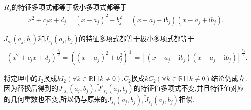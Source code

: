 \documentclass[../../main.tex]{subfiles}
\begin{document}
\begin{theorem}[实数域上的广义Jordan标准型]
$R_j$的特征多项式都等于极小多项式都等于
\begin{align*}
x^2+c_jx+d_j=(x-a_j)^2+b_j^2=\left( x-a_j-\mathrm{i}b_j \right) \left( x-a_j+\mathrm{i}b_j \right).
\end{align*}

$J_{s_j}(a_j,b_j)$和$\widetilde{J}_{s_j}(a_j,b_j)$的特征多项式都等于极小多项式都等于
\begin{align*}
(x^2+c_jx+d_j)^{\frac{s_j}{2}}=((x-a_j)^2+b_{j}^{2})^{\frac{s_j}{2}}=\left[ \left( x-a_j-\mathrm{i}b_j \right) \left( x-a_j+\mathrm{i}b_j \right) \right] ^{\frac{s_j}{2}}.
\end{align*}
\end{theorem}
\begin{note}
将定理中的$I_2$换成$kI_2(\forall k\in \mathbb{R}\text{且}k\ne 0)$,$C_2$换成$kC_2(\forall k\in \mathbb{R}\text{且}k\ne 0)$结论仍成立.因为替换后得到的$J'_{s_j}(a_j,b_j),\widetilde{J}'_{s_j}(a_j,b_j)$的特征值多项式不变,并且特征值对应的几何重数也不变,所以仍与原来的$J_{s_j}(a_j,b_j),\widetilde{J}_{s_j}(a_j,b_j)$相似.
\end{note}
\end{document}

